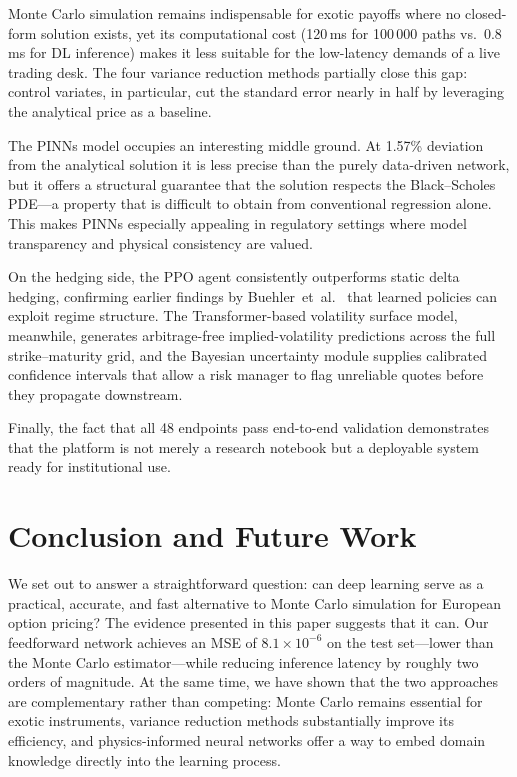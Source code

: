 \documentclass[conference]{IEEEtran}
\begin{document}
Monte Carlo simulation remains indispensable for exotic payoffs where no closed-form solution exists, yet its computational cost (120\,ms for 100\,000 paths vs.\ 0.8\,ms for DL inference) makes it less suitable for the low-latency demands of a live trading desk. The four variance reduction methods partially close this gap: control variates, in particular, cut the standard error nearly in half by leveraging the analytical price as a baseline.

The PINNs model occupies an interesting middle ground. At 1.57\% deviation from the analytical solution it is less precise than the purely data-driven network, but it offers a structural guarantee that the solution respects the Black--Scholes PDE---a property that is difficult to obtain from conventional regression alone. This makes PINNs especially appealing in regulatory settings where model transparency and physical consistency are valued.

On the hedging side, the PPO agent consistently outperforms static delta hedging, confirming earlier findings by Buehler~et~al.~\cite{b20} that learned policies can exploit regime structure. The Transformer-based volatility surface model, meanwhile, generates arbitrage-free implied-volatility predictions across the full strike--maturity grid, and the Bayesian uncertainty module supplies calibrated confidence intervals that allow a risk manager to flag unreliable quotes before they propagate downstream.

Finally, the fact that all 48 endpoints pass end-to-end validation demonstrates that the platform is not merely a research notebook but a deployable system ready for institutional use.


\section{Conclusion and Future Work}\label{sec:conclusion}

We set out to answer a straightforward question: can deep learning serve as a practical, accurate, and fast alternative to Monte Carlo simulation for European option pricing? The evidence presented in this paper suggests that it can. Our feedforward network achieves an MSE of $8.1 \times 10^{-6}$ on the test set---lower than the Monte Carlo estimator---while reducing inference latency by roughly two orders of magnitude. At the same time, we have shown that the two approaches are complementary rather than competing: Monte Carlo remains essential for exotic instruments, variance reduction methods substantially improve its efficiency, and physics-informed neural networks offer a way to embed domain knowledge directly into the learning process.
\end{document}
